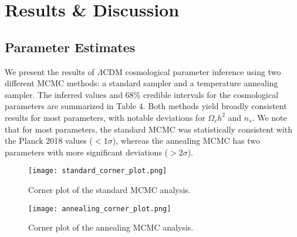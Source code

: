 \documentclass[11pt]{article}
\theoremstyle{definition}
\begin{document}
\bigskip

\section{Results \& Discussion}

\subsection{Parameter Estimates}

We present the results of $\Lambda$CDM cosmological parameter inference using two different MCMC methods: a standard sampler and a temperature annealing sampler. The inferred values and $68\%$ credible intervals for the cosmological parameters are summarized in Table $4$. Both methods yield broadly consistent results for most parameters, with notable deviations for $\Omega_c h^2$ and $n_s$. We note that for most parameters, the standard MCMC was statistically consistent with the Planck 2018 values ($<1\sigma$), whereas the annealing MCMC has two parameters with more significant deviations ($>2\sigma$).


\begin{figure}[htbp]
  \centering
  \texttt{[image: standard\_corner\_plot.png]}
  \caption{Corner plot of the standard MCMC analysis.}
  \label{fig:cmb-tt-comparison}
\end{figure}


\begin{figure}[htbp]
  \centering
  \texttt{[image: annealing\_corner\_plot.png]}
  \caption{Corner plot of the annealing MCMC analysis.}
  \label{fig:cmb-tt-comparison}
\end{figure}
\end{document}
